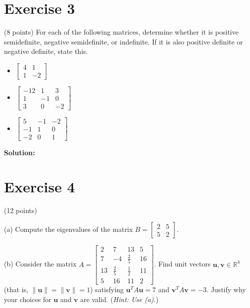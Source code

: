 \documentclass{article}
\begin{document}
\section*{Exercise 3}
(8 points) For each of the following matrices, determine whether it is positive semidefinite, negative semidefinite, or indefinite. If it is also positive definite or negative definite, state this.
\begin{itemize}
\item $\begin{bmatrix} 4 & 1 \\ 1 & -2 \end{bmatrix}$

\item $\begin{bmatrix} -12 & 1 & 3 \\ 1 & -1 & 0 \\ 3 & 0 & -2 \end{bmatrix}$

\item $\begin{bmatrix} 5 & -1 & -2 \\ -1 & 1 & 0 \\ -2 & 0 & 1 \end{bmatrix}$
\end{itemize}

\textbf{Solution: } \\



\newpage

\section*{Exercise 4}
(12 points)

(a) Compute the eigenvalues of the matrix $B = \begin{bmatrix} 2 & 5 \\ 5 & 2 \end{bmatrix}$.

(b) Consider the matrix $A = \begin{bmatrix} 2 & 7 & 13 & 5 \\ 7 & -4 & \frac{2}{5} & 16 \\ 13 & \frac{2}{5} & \frac{1}{2} & 11 \\ 5 & 16 & 11 & 2 \end{bmatrix}$. Find unit vectors $\mathbf{u}, \mathbf{v} \in \mathbb{R}^4$ (that is, $\|\mathbf{u}\| = \|\mathbf{v}\| = 1$) satisfying $\mathbf{u}^T A\mathbf{u} = 7$ and $\mathbf{v}^T A\mathbf{v} = -3$. Justify why your choices for $\mathbf{u}$ and $\mathbf{v}$ are valid.
(\textit{Hint: Use (a).}) \\
\end{document}
